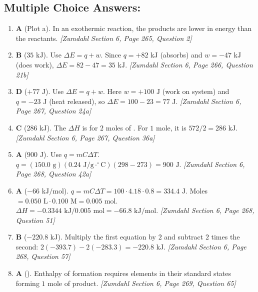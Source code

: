 \documentclass[12pt,letterpaper]{article}
\begin{document}
\subsection*{Multiple Choice Answers:}
\begin{enumerate}
    \item \textbf{A} (Plot a). In an exothermic reaction, the products are lower in energy than the reactants. \textit{[Zumdahl Section 6, Page 265, Question 2]}
    
    \item \textbf{B} ($35\text{ kJ}$). Use $\Delta E = q + w$. Since $q = +82\text{ kJ}$ (absorbs) and $w = -47\text{ kJ}$ (does work), $\Delta E = 82 - 47 = 35\text{ kJ}$. \textit{[Zumdahl Section 6, Page 266, Question 21b]}
    
    \item \textbf{D} ($+77\text{ J}$). Use $\Delta E = q + w$. Here $w = +100\text{ J}$ (work on system) and $q = -23\text{ J}$ (heat released), so $\Delta E = 100 - 23 = 77\text{ J}$. \textit{[Zumdahl Section 6, Page 267, Question 24a]}
    
    \item \textbf{C} ($286\text{ kJ}$). The $\Delta H$ is for $2$ moles of . For $1$ mole, it is $572 / 2 = 286\text{ kJ}$. \textit{[Zumdahl Section 6, Page 267, Question 36a]}
    
    \item \textbf{A} ($900\text{ J}$). Use $q = mC\Delta T$. $q = (150.0\text{ g})(0.24\text{ J/g}\cdot^\circ\text{C})(298 - 273) = 900\text{ J}$. \textit{[Zumdahl Section 6, Page 268, Question 42a]}
    
    \item \textbf{A} ($-66\text{ kJ/mol}$). $q = mC\Delta T = 100 \cdot 4.18 \cdot 0.8 = 334.4\text{ J}$. Moles $= 0.050\text{ L} \cdot 0.100\text{ M} = 0.005\text{ mol}$. $\Delta H = -0.3344\text{ kJ} / 0.005\text{ mol} = -66.8\text{ kJ/mol}$. \textit{[Zumdahl Section 6, Page 268, Question 51]}
    
    \item \textbf{B} ($-220.8\text{ kJ}$). Multiply the first equation by $2$ and subtract $2$ times the second: $2(-393.7) - 2(-283.3) = -220.8\text{ kJ}$. \textit{[Zumdahl Section 6, Page 268, Question 57]}
    
    \item \textbf{A} (). Enthalpy of formation requires elements in their standard states forming $1$ mole of product. \textit{[Zumdahl Section 6, Page 269, Question 65]}
    

\end{enumerate}
\end{document}
